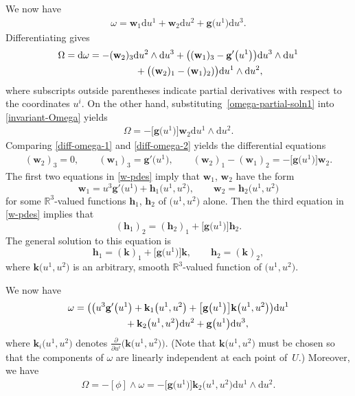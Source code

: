 \documentclass[pdftex]{sigma}
\numberwithin{equation}{section}
\renewcommand{\d}{\mathrm{d}}%
\newcommand{\bbR}{{\mathbb R}}
\newcommand{\mbg}{\mathbf{g}}
\newcommand{\mbh}{\mathbf{h}}
\newcommand{\mbk}{\mathbf{k}}
\newcommand{\mbw}{\mathbf{w}}
\begin{document}
We now have
\begin{gather}\label{omega-partial-soln1}
 \omega = \mbw_1 \d u^1 + \mbw_2 \d u^2 + \mbg\big(u^1\big) \d u^3.
\end{gather}
Differentiating gives
\begin{gather}
\Omega = \d\omega = -(\mbw_2)_3 \d u^2 \wedge \d u^3 +
\big( (\mbw_1)_3 - \mbg'\big(u^1\big) \big) \d u^3 \wedge \d u^1 \nonumber\\
\hphantom{\Omega = \d\omega =}{} + \big( (\mbw_2)_1 - (\mbw_1)_2) \big) \d u^1 \wedge \d u^2,\label{diff-omega-1}
\end{gather}
where subscripts outside parentheses indicate partial derivatives with respect to the coordinates $u^i$. On the other hand, substituting~\eqref{omega-partial-soln1} into \eqref{invariant-Omega} yields
\begin{gather}\label{diff-omega-2}
\Omega = -\big[\mbg\big(u^1\big)\big] \mbw_2 \d u^1 \wedge \d u^2.
\end{gather}
Comparing \eqref{diff-omega-1} and \eqref{diff-omega-2} yields the differential equations
\begin{gather}\label{w-pdes}
(\mbw_2)_3 = 0, \qquad (\mbw_1)_3 = \mbg'\big(u^1\big), \qquad (\mbw_2)_1 - (\mbw_1)_2 = -\big[\mbg\big(u^1\big)\big] \mbw_2.
\end{gather}
The first two equations in \eqref{w-pdes} imply that $\mbw_1$, $\mbw_2$ have the form
\[ \mbw_1 = u^3 \mbg'\big(u^1\big) + \mbh_1\big(u^1, u^2\big), \qquad \mbw_2 = \mbh_2\big(u^1, u^2\big) \]
for some $\bbR^3$-valued functions $\mbh_1$, $\mbh_2$ of $\big(u^1, u^2\big)$ alone. Then the third equation in \eqref{w-pdes} implies that
\[ (\mbh_1)_2 = (\mbh_2)_1 + \big[\mbg\big(u^1\big)\big] \mbh_2. \]
The general solution to this equation is
\[ \mbh_1 = (\mbk)_1 + \big[\mbg\big(u^1\big)\big] \mbk, \qquad \mbh_2 = (\mbk)_2, \]
where $\mbk\big(u^1, u^2\big)$ is an arbitrary, smooth $\bbR^3$-valued function of $\big(u^1, u^2\big)$.

We now have
\begin{gather}
\omega = \big( \big(u^3 \mbg'\big(u^1\big) + \mbk_1\big(u^1, u^2\big) + \big[\mbg\big(u^1\big)\big] \mbk\big(u^1, u^2\big) \big) \d u^1 \nonumber\\
\hphantom{\omega =}{} + \mbk_2\big(u^1, u^2\big) \d u^2 + \mbg\big(u^1\big) \d u^3,\label{lambda-zero-define-omega}
\end{gather}
where $\mbk_i\big(u^1, u^2\big)$ denotes $\frac{\partial}{\partial u^i} \big(\mbk\big(u^1, u^2\big)\big)$.
(Note that $\mbk\big(u^1, u^2\big)$ must be chosen so that the components of $\omega$ are linearly independent at each point of~$U$.)
Moreover, we have
\begin{gather*}%
\Omega = -[\phi] \wedge \omega = -\big[\mbg\big(u^1\big)\big] \mbk_2\big(u^1, u^2\big) \d u^1 \wedge \d u^2.
\end{gather*}
\end{document}
